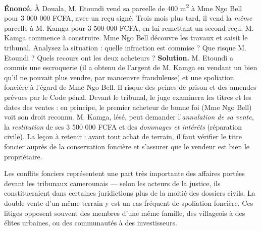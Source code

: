 \documentclass[11pt]{article}
\newcommand{\cle}[1]{{\popxbold\color{popdark}#1}}
\begin{document}
\begin{exoresolu}
\textbf{Énoncé.} À Douala, M. Etoundi vend sa parcelle de 400 m\textsuperscript{2} à Mme Ngo Bell pour 3 000 000 FCFA, avec un reçu signé. Trois mois plus tard, il vend la \emph{même} parcelle à M. Kamga pour 3 500 000 FCFA, en lui remettant un second reçu. M. Kamga commence à construire. Mme Ngo Bell découvre les travaux et saisit le tribunal. Analysez la situation : quelle infraction est commise ? Que risque M. Etoundi ? Quels recours ont les deux acheteurs ?
\tcblower
\textbf{Solution.} M. Etoundi a commis une \cle{escroquerie} (il a obtenu de l'argent de M. Kamga en vendant un bien qu'il ne pouvait plus vendre, par manœuvre frauduleuse) et une \cle{spoliation foncière} à l'égard de Mme Ngo Bell. Il risque des peines de prison et des amendes prévues par le Code pénal. Devant le tribunal, le juge examinera les titres et les dates des ventes : en principe, le premier acheteur de bonne foi (Mme Ngo Bell) voit son droit reconnu. M. Kamga, lésé, peut demander l'\emph{annulation de sa vente}, la \emph{restitution} de ses 3 500 000 FCFA et des \emph{dommages et intérêts} (réparation civile). La leçon à retenir : avant tout achat de terrain, il faut vérifier le titre foncier auprès de la conservation foncière et s'assurer que le vendeur est bien le propriétaire.
\end{exoresolu}

\begin{exemplebox}
Les conflits fonciers représentent une part très importante des affaires portées devant les tribunaux camerounais — selon les acteurs de la justice, ils constitueraient dans certaines juridictions plus de la moitié des dossiers civils. La double vente d'un même terrain y est un cas fréquent de spoliation foncière. Ces litiges opposent souvent des membres d'une même famille, des villageois à des élites urbaines, ou des communautés à des investisseurs.
\end{exemplebox}
\end{document}

